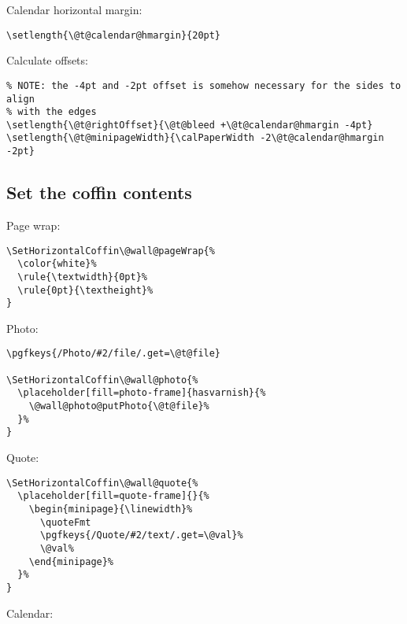 \documentclass[11pt,oneside]{memoir-article}
\begin{document}
Calendar horizontal margin:

\begin{verbatim}
\setlength{\@t@calendar@hmargin}{20pt}
\end{verbatim}

Calculate offsets:

\begin{verbatim}
% NOTE: the -4pt and -2pt offset is somehow necessary for the sides to align
% with the edges
\setlength{\@t@rightOffset}{\@t@bleed +\@t@calendar@hmargin -4pt}
\setlength{\@t@minipageWidth}{\calPaperWidth -2\@t@calendar@hmargin -2pt}
\end{verbatim}

\subsection{Set the coffin contents}
\label{sec-10-4-4}

Page wrap:

\begin{verbatim}
\SetHorizontalCoffin\@wall@pageWrap{%
  \color{white}%
  \rule{\textwidth}{0pt}%
  \rule{0pt}{\textheight}%
}
\end{verbatim}

Photo:

\begin{verbatim}
\pgfkeys{/Photo/#2/file/.get=\@t@file}

\SetHorizontalCoffin\@wall@photo{%
  \placeholder[fill=photo-frame]{hasvarnish}{%
    \@wall@photo@putPhoto{\@t@file}%
  }%
}
\end{verbatim}

Quote:

\begin{verbatim}
\SetHorizontalCoffin\@wall@quote{%
  \placeholder[fill=quote-frame]{}{%
    \begin{minipage}{\linewidth}%
      \quoteFmt
      \pgfkeys{/Quote/#2/text/.get=\@val}%
      \@val%
    \end{minipage}%
  }%
}
\end{verbatim}

Calendar:
\end{document}
